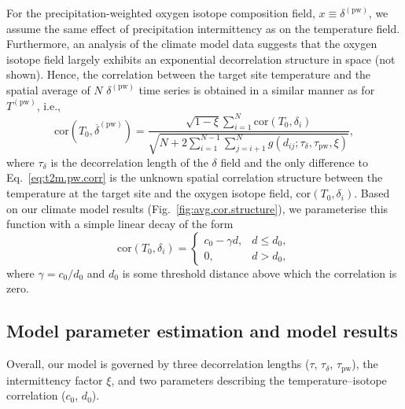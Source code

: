 \documentclass[cp, manuscript]{copernicus}
\begin{document}
For the precipitation-weighted oxygen isotope composition field, $x \equiv
\delta^{\mathrm{(pw)}}$, we assume the same effect of precipitation
intermittency as on the temperature field. Furthermore, an analysis of the
climate model data suggests that the oxygen isotope field largely exhibits
an exponential decorrelation structure in space (not shown). Hence, the
correlation between the target site temperature and the spatial average of $N$
$\delta^{\mathrm{(pw)}}$ time series is obtained in a similar manner as for
$T^{\mathrm{(pw)}}$, i.e.,
%
\begin{equation}
\label{eq:oxy.pw.corr}
\mathrm{cor}\left(T_0,
  \overline{\delta}^{\mathrm{(pw)}}\right)=
\frac
{\sqrt{1-\xi}\sum_{i=1}^{N}\mathrm{cor}\left(T_0,\delta_i\right)}
{\sqrt{N + 2\sum_{i=1}^{N-1}\sum_{j=i+1}^{N}
  g(d_{ij}; \tau_{\delta}, \tau_{\mathrm{pw}}, \xi)}},
\end{equation}
%
where $\tau_{\delta}$ is the decorrelation length of the $\delta$ field and the
only difference to Eq.~\eqref{eq:t2m.pw.corr} is the unknown spatial
correlation structure between the temperature at the target site and the oxygen
isotope field, $\mathrm{cor}\left(T_0,\delta_i\right)$.  Based on our climate
model results (Fig.~\ref{fig:avg.cor.structure}), we parameterise this
function with a simple linear decay of the form
%
\begin{equation}
\label{eq:t2m.oxy.corr}
\mathrm{cor}\left(T_0,\delta_i\right)=
\begin{cases}
  c_0 - \gamma d, & d \le d_0,\\
  0, & d > d_0,
\end{cases}
\end{equation}
%
where $\gamma=c_0/d_0$ and $d_0$ is some threshold distance above which
the correlation is zero.

\subsection{Model parameter estimation and model results}
\label{app:concept.model.estimation}

Overall, our model is governed by three decorrelation lengths ($\tau$,
$\tau_{\delta}$, $\tau_{\mathrm{pw}}$), the intermittency factor $\xi$, and two
parameters describing the temperature--isotope correlation ($c_0$, $d_0$).
\end{document}
